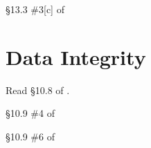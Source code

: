 \begin{problem}[10 points]
	\S 13.3 \#3[c] of \cite {tw}
\end{problem}


	\section{Data Integrity}

Read \S 10.8 of \cite{tw}.

\begin{problem}[10 points]
	\S 10.9 \#4 of \cite {tw}
\end{problem}

\begin{problem}[10 points]
	\S 10.9 \#6 of \cite {tw}
\end{problem}


